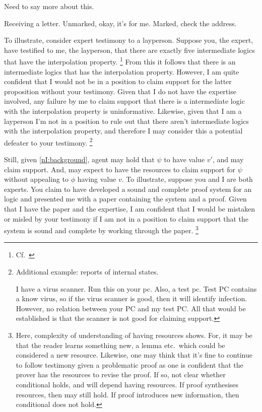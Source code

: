 \begin{note}
  \color{red}
  Need to say more about this.
\end{note}

\begin{note}
  Receiving a letter.
  Unmarked, okay, it's for me.
  Marked, check the address.
\end{note}

\begin{note}
  To illustrate, consider expert testimony to a layperson.
  Suppose you, the expert, have testified to me, the layperson, that there are exactly five intermediate logics that have the interpolation property.\nolinebreak
  \footnote{Cf.\ \textcite{Maksimova:1977un}}
  From this it follows that there is an intermediate logics that has the interpolation property.
  However, I am quite confident that I would not be in a position to claim support for the latter proposition without your testimony.
  Given that I do not have the expertise involved, any failure by me to claim support that there is a intermediate logic with the interpolation property is uninformative.
  Likewise, given that I am a layperson I'm not in a position to rule out that there aren't intermediate logics with the interpolation property, and therefore I may consider this a potential defeater to your testimony.\nolinebreak
  \footnote{
    Additional example: reports of internal states.

    I have a virus scanner.
    Run this on your pc.
    Also, a test pc.
    Test PC contains a know virus, so if the virus scanner is good, then it will identify infection.
    However, no relation between your PC and my test PC.
    All that would be established is that the scanner is not good for claiming support.
    }

  Still, given \ref{nI:background}, agent may hold that \(\psi\) to have value \(v'\), and may claim support.
  And, may expect to have the resources to claim support for \(\psi\) without appealing to \(\phi\) having value \(v\).
  To illustrate, suppose you and I are both experts.
  You claim to have developed a sound and complete proof system for an logic and presented me with a paper containing the system and a proof.
  Given that I have the paper and the expertise, I am confident that I would be mistaken or misled by your testimony if I am not in a position to claim support that the system is sound and complete by working through the paper.\nolinebreak
  \footnote{
    Here, complexity of understanding of having resources shows.
    For, it may be that the reader learns something new, a lemma etc.\ which could be considered a new resource.
    Likewise, one may think that it's fine to continue to follow testimony given a problematic proof as one is confident that the prover has the resources to revise the proof.
    If so, not clear whether conditional holds, and will depend having resources.
    If proof synthesises resources, then may still hold.
    If proof introduces new information, then conditional does not hold.

}
\end{note}
